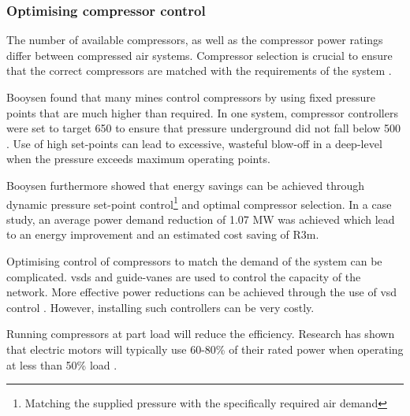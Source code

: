 		\subsubsection{Optimising compressor control}
		The number of available compressors, as well as the compressor power ratings differ between compressed air systems. Compressor selection is crucial to ensure that the correct compressors are matched with the requirements of the system \cite{marais2010expert}.
		\par 
		Booysen \cite{Booysen2012Masters} found that many mines control compressors by using fixed pressure points that are much higher than required. In one system, compressor controllers were set to target 650  to ensure that pressure underground did not fall below 500 . Use of high  set-points can lead to excessive, wasteful blow-off in a deep-level when the pressure exceeds maximum operating points.
		\par
		 Booysen \cite{booysen2009optimising} furthermore showed that energy savings can be achieved through dynamic pressure  set-point control\footnote{Matching the supplied pressure with the specifically required air demand} and optimal compressor selection. In a case study, an average power demand reduction of 1.07 MW was achieved which lead to an energy improvement and an estimated cost saving of R3m.
		\par 
	 	Optimising control of compressors to match the demand of the system can be complicated. \glspl{vsd} and guide-vanes are used to control the capacity of the network. More effective power reductions can be achieved through the use of \gls{vsd} control \cite{Bredenkamp2013Masters}. However, installing such  controllers can be very costly.
	 	\par 
	 	 Running compressors at part load will reduce the efficiency. Research has shown that electric motors will typically use 60-80\% of their rated power when operating at less than 50\% load \cite{Saidur2010}.
